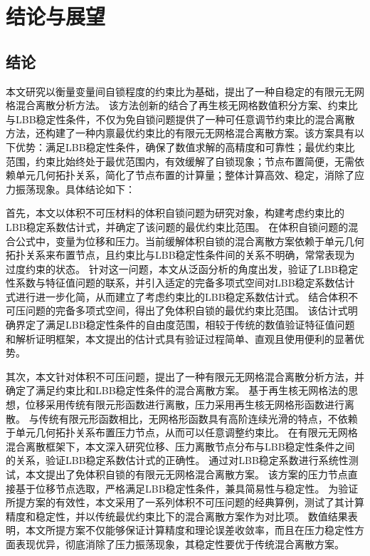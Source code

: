 \chapter{结论与展望}
\section{结论}
本文研究以衡量变量间自锁程度的约束比为基础，提出了一种自稳定的有限元无网格混合离散分析方法。
该方法创新的结合了再生核无网格数值积分方案、约束比与LBB稳定性条件，不仅为免自锁问题提供了一种可任意调节约束比的混合离散方法，还构建了一种内禀最优约束比的有限元无网格混合离散方案。该方案具有以下优势：满足LBB稳定性条件，确保了数值求解的高精度和可靠性；最优约束比范围，约束比始终处于最优范围内，有效缓解了自锁现象；节点布置简便，无需依赖单元几何拓扑关系，简化了节点布置的计算量；整体计算高效、稳定，消除了应力振荡现象。具体结论如下：

首先，本文以体积不可压材料的体积自锁问题为研究对象，构建考虑约束比的LBB稳定系数估计式，并确定了该问题的最优约束比范围。
在体积自锁问题的混合公式中，变量为位移和压力。当前缓解体积自锁的混合离散方案依赖于单元几何拓扑关系来布置节点，且约束比与LBB稳定性条件间的关系不明确，常常表现为过度约束的状态。
针对这一问题，本文从泛函分析的角度出发，验证了LBB稳定性系数与特征值问题的联系，并引入适定的完备多项式空间对LBB稳定系数估计式进行进一步化简，从而建立了考虑约束比的LBB稳定系数估计式。
结合体积不可压问题的完备多项式空间，得出了免体积自锁的最优约束比范围。
该估计式明确界定了满足LBB稳定性条件的自由度范围，相较于传统的数值验证特征值问题和解析证明框架，本文提出的估计式具有验证过程简单、直观且使用便利的显著优势。

其次，本文针对体积不可压问题，提出了一种有限元无网格混合离散分析方法，并确定了满足约束比和LBB稳定性条件的混合离散方案。
基于再生核无网格法的思想，位移采用传统有限元形函数进行离散，压力采用再生核无网格形函数进行离散。
与传统有限元形函数相比，无网格形函数具有高阶连续光滑的特点，不依赖于单元几何拓扑关系布置压力节点，从而可以任意调整约束比。
在有限元无网格混合离散框架下，本文深入研究位移、压力离散节点分布与LBB稳定性条件之间的关系，验证LBB稳定系数估计式的正确性。
通过对LBB稳定系数进行系统性测试，本文提出了免体积自锁的有限元无网格混合离散方案。
该方案的压力节点直接基于位移节点选取，严格满足LBB稳定性条件，兼具简易性与稳定性。
为验证所提方案的有效性，本文采用了一系列体积不可压问题的经典算例，测试了其计算精度和稳定性，并以传统最优约束比下的混合离散方案作为对比项。
数值结果表明，本文所提方案不仅能够保证计算精度和理论误差收敛率，而且在压力稳定性方面表现优异，彻底消除了压力振荡现象，其稳定性要优于传统混合离散方案。

